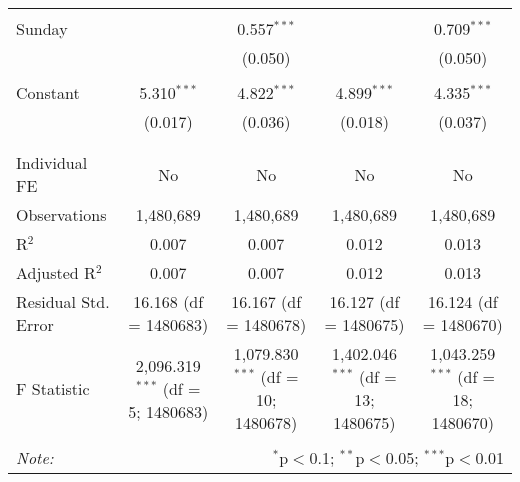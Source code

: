 \documentclass[
]{article}
\begin{document}
\begin{table}[!htbp]
{\begin{tabular}{@{\extracolsep{5pt}}lcccc}
  & & & & \\ 
 Sunday &  & 0.557$^{***}$ &  & 0.709$^{***}$ \\ 
  &  & (0.050) &  & (0.050) \\ 
  & & & & \\ 
 Constant & 5.310$^{***}$ & 4.822$^{***}$ & 4.899$^{***}$ & 4.335$^{***}$ \\ 
  & (0.017) & (0.036) & (0.018) & (0.037) \\ 
  & & & & \\ 
\hline \\[-1.8ex] 
Individual FE & No & No & No & No \\ 
Observations & 1,480,689 & 1,480,689 & 1,480,689 & 1,480,689 \\ 
R$^{2}$ & 0.007 & 0.007 & 0.012 & 0.013 \\ 
Adjusted R$^{2}$ & 0.007 & 0.007 & 0.012 & 0.013 \\ 
Residual Std. Error & 16.168 (df = 1480683) & 16.167 (df = 1480678) & 16.127 (df = 1480675) & 16.124 (df = 1480670) \\ 
F Statistic & 2,096.319$^{***}$ (df = 5; 1480683) & 1,079.830$^{***}$ (df = 10; 1480678) & 1,402.046$^{***}$ (df = 13; 1480675) & 1,043.259$^{***}$ (df = 18; 1480670) \\ 
\hline 
\hline \\[-1.8ex] 
\textit{Note:}  & \multicolumn{4}{r}{$^{*}$p$<$0.1; $^{**}$p$<$0.05; $^{***}$p$<$0.01} \\ 
\end{tabular}
} 
\end{table} 
\newpage
\end{document}
